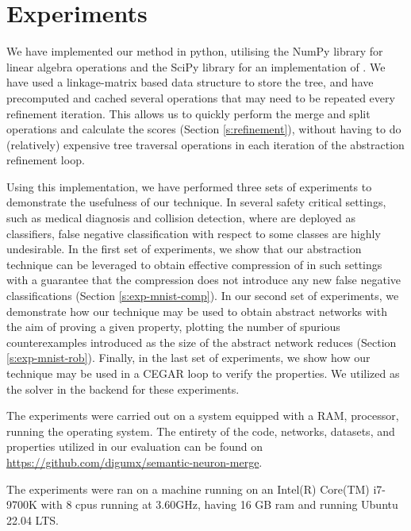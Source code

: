 \section{Experiments}

We have implemented our method in python, utilising the NumPy \cite{numpy}
library for linear algebra operations and the SciPy \cite{scipy} library for an
implementation of \hcluster.
We have used a linkage-matrix \cite{scipy-hcluster-linkage}  based
data structure to store the tree, and have precomputed and cached several
operations that may need to be repeated every refinement iteration. This allows
us to quickly perform the merge and split operations and calculate the
scores (Section \ref{s:refinement}), without having to do (relatively)
expensive tree traversal operations in each iteration of the abstraction
refinement loop. 

Using this implementation, we have performed three sets of experiments to
demonstrate the usefulness of our technique. In several safety critical
settings, such as medical diagnosis and collision detection, where \dnn are
deployed as classifiers, false negative classification with respect to some
classes are highly undesirable. In the first set of experiments, we show that
our abstraction technique can be leveraged to obtain effective compression of
\dnn in such settings with a guarantee that the compression does not introduce
any new false negative classifications (Section \ref{s:exp-mnist-comp}). In our
second set of experiments, we demonstrate how our technique may be used to
obtain abstract networks with the aim of proving a given property, plotting the
number of spurious counterexamples introduced as the size of the abstract
network reduces (Section \ref{s:exp-mnist-rob}). Finally, in the last set of
experiments, we show how our technique may be used in a CEGAR loop
\cite{cegar-nn} to verify the \acasxu properties. We utilized \abcrown as the 
solver in the backend for these experiments.


The experiments were carried out on a system equipped with a  RAM,
 processor, running the  operating system. 
The entirety of the code, networks, datasets, and properties utilized in our 
evaluation can be found on \href{https://github.com/digumx/semantic-neuron-merge}{https://github.com/digumx/semantic-neuron-merge}.



The experiments were ran on a machine running on an Intel(R) Core(TM) i7-9700K
with 8 cpus running at 3.60GHz, having 16 GB ram and running Ubuntu 22.04 LTS.

